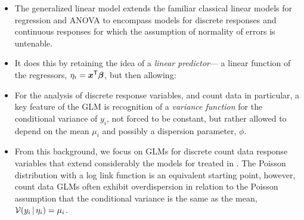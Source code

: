 \begin{itemize}

  \item The generalized linear model extends the familiar classical linear models for regression and ANOVA to encompass
  models for discrete responses and continuous responses for which the assumption of normality of errors is untenable.

  \item It does this by retaining the idea of a \emph{linear predictor}---
  a linear function of the regressors,
  $\eta_i = \bm{x}^\mathsf{T} \bm{\beta}$, but then allowing:

  \item For the analysis of discrete response variables, and count data in particular, a key feature
  of the GLM is recognition of a \emph{variance function} for the conditional variance of
  $y_i$, not forced to be constant, but rather allowed to depend on the mean $\mu_i$ and
  possibly a dispersion parameter, $\phi$.

  \item From this background, we focus on GLMs for discrete count data response variables that extend considerably
  the \loglin models for \ctabs
  treated in .  The Poisson distribution with a log
  link function is an equivalent starting point, however, count data
  GLMs often exhibit overdispersion in relation to the Poisson assumption that the conditional variance
  is the same as the mean, $\mathcal{V}(y_i \, | \, \eta_i) = \mu_i$.


\end{itemize}
